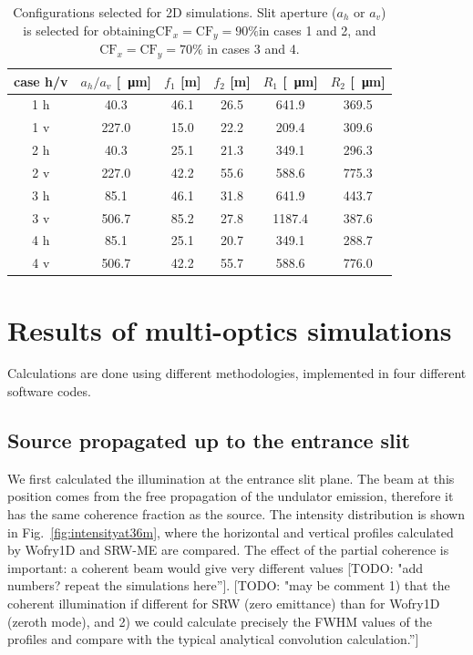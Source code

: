 \documentclass{iucr}              %
\newcommand{\todo}[1]{{\color{red}[TODO: "#1'']}}
\begin{document}
\begin{table}[]
    \label{table:2Dusercases}
    \caption{Configurations selected for 2D simulations. Slit aperture ($a_h$ or $a_v$) is selected for obtaining$\text{CF}_{x}=\text{CF}_{y}=90\%$in cases 1 and 2, and $\text{CF}_{x}=\text{CF}_{y}=70\%$ in cases 3 and 4. 
    }
    \begin{tabular}{c|c|c|c|c|c}
         case h/v & $a_h/a_v$ [\SI{}{\micro\meter}] & $f_1$ [m] & $f_2$ [m] & $R_1$ [\SI{}{\micro\meter}]& $R_2$ [\SI{}{\micro\meter}] \\
         \hline
1 h &      40.3 & 46.1 &     26.5 &     641.9 &     369.5 
\\
1 v &      227.0 & 15.0 &     22.2 &     209.4 &     309.6 
\\
\hline
2 h &      40.3 & 25.1 &     21.3 &     349.1 &     296.3  
\\
2 v &      227.0 & 42.2 &     55.6 &     588.6 &     775.3 
\\
\hline \hline
3 h &      85.1 & 46.1 &     31.8 &     641.9 &     443.7 
\\
3 v &      506.7 & 85.2 &     27.8 &     1187.4 &     387.6  
\\
\hline
4 h &      85.1 & 25.1 &     20.7 &     349.1 &     288.7 
\\
4 v &      506.7 & 42.2 &     55.7 &     588.6 &     776.0 

    \end{tabular}
\end{table}


\section{Results of multi-optics simulations}
\label{sec:complete-beamline}

Calculations are done using different methodologies, implemented in four different software codes. 

\subsection{Source propagated up to the entrance slit}

We first calculated the illumination at the entrance slit plane. The beam at this position comes from the free propagation of the undulator emission, therefore it has the same coherence fraction as the source. The intensity distribution is shown in Fig.~\ref{fig:intensityat36m}, where the horizontal and vertical profiles calculated by Wofry1D and SRW-ME are compared. The effect of the partial coherence is important: a coherent beam would give very different values \todo{add numbers? repeat the simulations here}. \todo{may be comment 1) that the coherent illumination if different for SRW (zero emittance) than for Wofry1D (zeroth mode), and 2) we could calculate precisely the FWHM values of the profiles and compare with the typical analytical convolution calculation.}   
\end{document}
